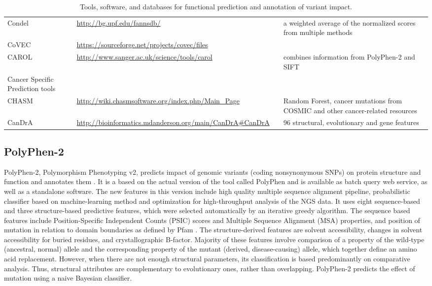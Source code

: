 \documentclass{article}
\begin{document}
\begin{table}[p]
\begin{tabularx}{\textwidth}{p{3cm}Xp{1.7cm}X}
  Condel & \url{http://bg.upf.edu/fannsdb/} & \cite{Gonzalez-Perez2011-gc} & a weighted average of the normalized scores from multiple methods \\
  CoVEC & \url{https://sourceforge.net/projects/covec/files} &   &   \\
  CAROL & \url{http://www.sanger.ac.uk/science/tools/carol} & \cite{Lopes2012-je} & combines information from PolyPhen-2 and SIFT \\
  Cancer Specific Prediction tools &  &  &   \\
  CHASM & \url{http://wiki.chasmsoftware.org/index.php/Main_Page} & \cite{Carter2009-ci} & Random Forest, cancer mutations from COSMIC and other cancer-related resources \\
  CanDrA & \url{http://bioinformatics.mdanderson.org/main/CanDrA\#CanDrA} & \cite{Mao2013-ie} & 96  structural, evolutionary and gene features  \\
   \hline
\end{tabularx}
\caption{Tools, software, and databases for functional prediction and annotation of variant impact. }
\label{table:2}
\end{table}

\subsection{PolyPhen-2}

PolyPhen-2, Polymorphism
Phenotyping v2, predicts impact of genomic variants (coding
nonsynonymous SNPs) on protein structure and function and annotates
them \cite{Adzhubei2013-nj}. It is a based on the actual version of
the tool called PolyPhen and is available as batch query web service,
as well as a standalone software. The new features in this version
include high quality multiple sequence alignment pipeline,
probabilistic classifier based on machine-learning method and
optimization for high-throughput analysis of the NGS data. It uses
eight sequence-based and three structure-based predictive features,
which were selected automatically by an iterative greedy
algorithm. The sequence based features include Position-Specific
Independent Counts (PSIC) scores and Multiple Sequence Alignment (MSA)
properties, and position of mutation in relation to domain boundaries
as defined by Pfam \cite{Bateman2004-da}. The structure-derived
features are solvent accessibility, changes in solvent accessibility
for buried residues, and crystallographic B-factor. Majority of these
features involve comparison of a property of the wild-type (ancestral,
normal) allele and the corresponding property of the mutant (derived,
disease-causing) allele, which together define an amino acid
replacement. However, when there are not enough structural parameters,
its classification is based predominantly on comparative
analysis. Thus, structural attributes are complementary to
evolutionary ones, rather than overlapping. PolyPhen-2 predicts the
effect of mutation using a naive Bayesian classifier.
\end{document}
